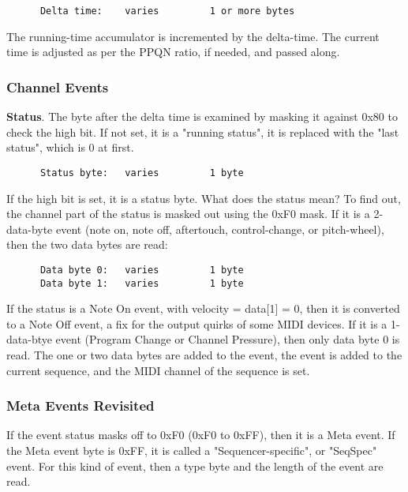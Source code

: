    \begin{verbatim}
      Delta time:    varies         1 or more bytes
   \end{verbatim}

   The running-time accumulator is incremented by the delta-time.
   The current time is adjusted as per the PPQN ratio, if needed, and passed
   along.

\subsubsection{Channel Events}
\label{subsubsec:midi_format_channel_events}

   \textbf{Status}.
   The byte after the delta time is examined by masking it against 0x80 to check
   the high bit.  If not set, it is a "running status", it is replaced with the
   "last status", which is 0 at first.

   \begin{verbatim}
      Status byte:   varies         1 byte
   \end{verbatim}

   If the high bit is set, it is a status byte.  What does the status mean?  To
   find out, the channel part of the status is masked out using the 0xF0 mask.
   If it is a 2-data-byte event (note on, note off, aftertouch, control-change,
   or pitch-wheel), then the two data bytes are read:

   \begin{verbatim}
      Data byte 0:   varies         1 byte
      Data byte 1:   varies         1 byte
   \end{verbatim}

   If the status is a Note On event, with velocity = data[1] = 0,
   then it is converted to a Note Off event, a fix for the output quirks of
   some MIDI devices.
   If it is a 1-data-btye event (Program Change or Channel Pressure), then only
   data byte 0 is read.
   The one or two data bytes are added to the event,
   the event is added to the current sequence,
   and the MIDI channel of the sequence is set.

\subsubsection{Meta Events Revisited}
\label{subsubsec:midi_format_meta_events_revisited}

   If the event status masks off to 0xF0 (0xF0 to 0xFF), then it is a Meta
   event.  If the Meta event byte is 0xFF, it is called a "Sequencer-specific",
   or "SeqSpec" event.  For this kind of event, then a type byte and the length
   of the event are read.

